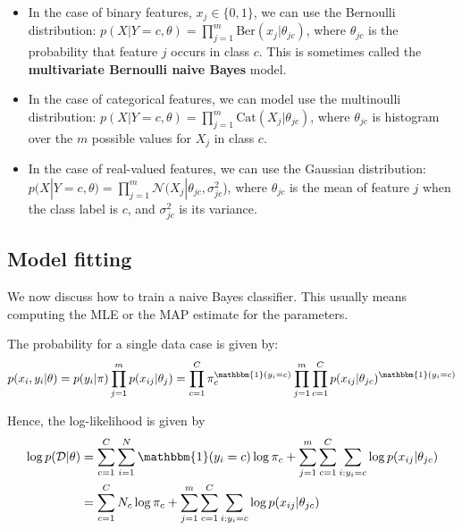 \documentclass[12pt, a4paper]{article}
\theoremstyle{definition}
\numberwithin{figure}{section}
\numberwithin{equation}{section}
\numberwithin{table}{section}
\begin{document}
\begin{itemize}
    \item In the case of binary features, $x_j \in \{0, 1\}$, we can use the Bernoulli distribution: $p(X|Y=c,\theta)=\prod_{j=1}^m \text{Ber}(x_j|\theta_{jc})$, where $\theta_{jc}$ is the probability that feature $j$ occurs in class $c$. This is sometimes called the \textbf{multivariate Bernoulli naive Bayes} model.
    \item In the case of categorical features, we can model use the multinoulli distribution: $p(X|Y=c,\theta)=\prod_{j=1}^m \text{Cat}(X_j|\theta_{jc})$, where $\theta_{jc}$ is histogram over the $m$ possible values for $X_j$ in class $c$.
    \item In the case of real-valued features, we can use the Gaussian distribution: $p(X|Y=c,\theta)=\prod_{j=1}^m \mathcal{N}(X_j|\theta_{jc}, \sigma_{jc}^2$), where $\theta_{jc}$ is the mean of feature $j$ when the class label is $c$, and $\sigma_{jc}^2$ is its variance.
\end{itemize}


\subsection{Model fitting}
We now discuss how to train a naive Bayes classifier. This usually means computing the MLE or the MAP estimate for the parameters.

The probability for a single data case is given by:
\begin{equation}
    p(x_i, y_i | \theta) = p(y_i | \pi) \prod_{j=1}^m p(x_{ij} | \theta_j) = 
    \prod_{c=1}^C \pi_c^{\mathbbm{1}(y_i = c)} \prod_{j=1}^m \prod_{c=1}^C p(x_{ij} | \theta_{jc})^{\mathbbm{1}(y_i = c)}
\end{equation}

Hence, the log-likelihood is given by  
\begin{align}
\log p(\mathcal{D} | \theta)
&= \sum_{c=1}^{C} \sum_{i=1}^N \mathbbm{1}(y_i = c) \log \pi_c + \sum_{j=1}^{m} \sum_{c=1}^{C} \sum_{i:y_i = c} \log p(x_{ij} | \theta_{jc})\\
&= \sum_{c=1}^{C} N_c \log \pi_c + \sum_{j=1}^{m} \sum_{c=1}^{C} \sum_{i:y_i = c} \log p(x_{ij} | \theta_{jc})
\end{align}
\end{document}
